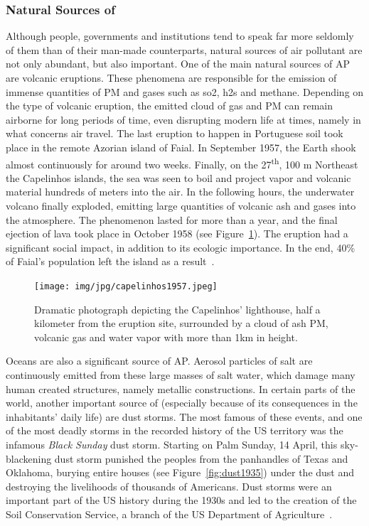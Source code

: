 \subsubsection{Natural Sources of }%
\label{ssub:natural_sources_of_ap}

Although people, governments and institutions tend to speak far more
seldomly of them than of their man-made counterparts, natural sources of
air pollutant are not only abundant, but also important. One of the main
natural sources of \gls{AP} are volcanic eruptions. These phenomena are
responsible for the emission of immense quantities of \gls{PM} and gases
such as \gls{so2}, \gls{h2s} and methane. Depending on the type of
volcanic eruption, the emitted cloud of gas and \gls{PM} can remain
airborne for long periods of time, even disrupting modern life at times,
namely in what concerns air travel. The last eruption to happen in
Portuguese soil took place in the remote Azorian island of Faial. In
September 1957, the Earth shook almost continuously for around two
weeks. Finally, on the 27\textsuperscript{th}, 100 m Northeast the
Capelinhos islands, the sea was seen to boil and project vapor and
volcanic material hundreds of meters into the air. In the following
hours, the underwater volcano finally exploded, emitting large
quantities of volcanic ash and gases into the atmosphere. The phenomenon
lasted for more than a year, and the final ejection of lava took place
in October 1958 (see Figure~\ref{fig:capelinhos1957}). The eruption had
a significant social impact, in addition to its ecologic importance. In
the end, 40\% of Faial's population left the island as a
result~\cite{Vallero2014, TSF2017}.

\begin{figure}[htpb]
    \centering
    \texttt{[image: img/jpg/capelinhos1957.jpeg]}
    \caption{Dramatic photograph depicting the Capelinhos' lighthouse,
    half a kilometer from the eruption site, surrounded by a cloud of
    ash \gls{PM}, volcanic gas and water vapor with more than 1km in
    height\cite{TSF2017}.}
    \label{fig:capelinhos1957}
\end{figure}

Oceans are also a significant source of \gls{AP}. Aerosol particles of
salt are continuously emitted from these large masses of salt water,
which damage many human created structures, namely metallic
constructions. In certain parts of the world, another important source
of  (especially because of its consequences in the
inhabitants' daily life) are dust storms. The most famous of these
events, and one of the most deadly storms in the recorded history of the
US territory was the infamous \emph{Black Sunday} dust storm. Starting
on Palm Sunday, 14 April, this sky-blackening dust storm punished the
peoples from the panhandles of Texas and Oklahoma, burying entire houses
(see Figure~\ref{fig:dust1935}) under the dust and destroying the
livelihoods of thousands of Americans. Dust storms were an important
part of the US history during the 1930s and led to the creation of the
Soil Conservation Service, a branch of the US Department of
Agriculture~\cite{Vallero2014,Agriculture2012, Reis2008}.


